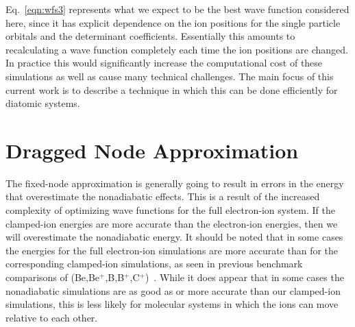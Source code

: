 \documentclass[aip,jcp,numerical,reprint]{revtex4-1}
\begin{document}
Eq.~\eqref{eqn:wfs3} represents what we expect to be the best wave function considered here, since it has explicit dependence on the ion positions for the single particle orbitals and the determinant coefficients. Essentially this amounts to recalculating a wave function completely each time the ion positions are changed.  In practice this would significantly increase the computational cost of these simulations as well as cause many technical challenges.  The main focus of this current work is to describe a technique in which this can be done efficiently for diatomic systems. 


\section{Dragged Node Approximation}


The fixed-node approximation is generally going to result in errors in the energy that overestimate the nonadiabatic effects.   This is a result of the increased complexity of optimizing wave functions for the full electron-ion system.   If the clamped-ion energies are more accurate than the electron-ion energies, then we will overestimate the nonadiabatic energy.   %
It should be noted that in some cases the energies for the full electron-ion simulations are more accurate than for the corresponding clamped-ion simulations, as seen in previous benchmark comparisons of (Be,Be$^{+}$,B,B$^{+}$,C$^{+}$)~\cite{Yang2015}.  While it does appear that in some cases the nonadiabatic simulations are as good as or more accurate than our clamped-ion simulations, this is less likely for molecular systems in which the ions can move relative to each other.    %
\end{document}
